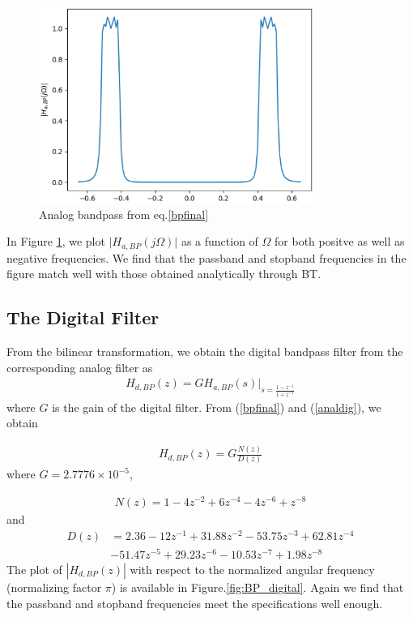 \documentclass[journal,12pt,twocolumn]{IEEEtran}
\begin{document}
\begin{enumerate}
\begin{figure}
    \includegraphics[width=9cm]{./figs/iir/ee18btech11017_analog_bp.eps}
    \caption{Analog bandpass from eq.\ref{bpfinal}}
    \label{fig:Analog_BP}
\end{figure}
In Figure \ref{fig:Analog_BP}, we plot $\vert H_{a,BP}(j\Omega)\vert$ as a function of $\Omega$ for both positve as
well as negative frequencies.  We find that the passband and stopband frequencies in the figure
match well with those obtained analytically through BT.
\end{enumerate}

\subsection{The Digital Filter}
From the bilinear transformation, we obtain the digital bandpass filter from the corresponding analog filter as
\begin{eqnarray}
\label{analdig}
H_{d,BP}(z) = GH_{a,BP}(s)\vert_{s = \frac{1-z^{-1}}{1 + z^{-1}}}
\end{eqnarray}
where $G$ is the gain of the digital filter.  From (\ref{bpfinal}) and (\ref{analdig}), we obtain

\begin{eqnarray}
H_{d,BP}(z) = G \frac{N(z)}{D(z)}
\end{eqnarray}
where $G = 2.7776 \times 10^{-5}$,

\begin{eqnarray}
N(z) =  1 - 4 z^{-2} + 6 z^{-4} - 4z^{-6} + z^{-8} 
\end{eqnarray}
and
\begin{align}
D(z) &= 2.36 -12z^{-1} + 31.88z^{-2}  -53.75z^{-3} +  62.81z^{-4}\nonumber \\
  &-51.47z^{-5}+   29.23z^{-6}  -10.53z^{-7} +1.98z^{-8}
\end{align}
The plot of $|H_{d,BP}(z)|$ with respect to the normalized angular frequency (normalizing factor $\pi$) is available in Figure.\ref{fig:BP_digital}.  Again we
find that the passband and stopband frequencies meet the specifications well enough.
\end{document}
